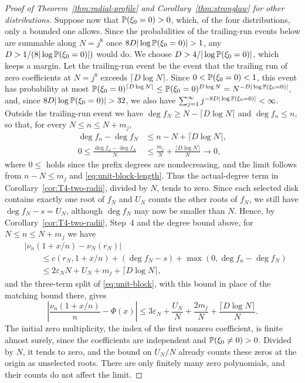 \begin{proof}[Proof of Theorem~\ref{thm:radial-profile} and Corollary~\ref{thm:stronglaw} for other distributions]
Suppose now that $\mathbb P(\xi_0=0)>0$, which, of the four distributions,
only a bounded one allows.
Since the probabilities of the trailing-run events below are summable
along $N=j^8$ once $8D|\log\Prob(\xi_0=0)|>1$, any
$D>1/(8|\log\mathbb P(\xi_0=0)|)$ would do.
We choose $D>4/|\log\mathbb P(\xi_0=0)|$, which keeps a margin.
Let the trailing-run event be the event that the trailing run of zero
coefficients at $N=j^8$ exceeds $\lceil D\log N\rceil$.
Since $0<\mathbb P(\xi_0=0)<1$, this event has probability at most
$\mathbb P(\xi_0=0)^{\lceil D\log N\rceil}\le\mathbb P(\xi_0=0)^{D\log N}
 =N^{-D|\log\mathbb P(\xi_0=0)|}$, and, since $8D|\log\Prob(\xi_0=0)|>32$,
we also have $\sum_{j=1}^\infty j^{-8D|\log\mathbb P(\xi_0=0)|}<\infty$.
Outside the trailing-run event we have
$\deg f_N\ge N-\lceil D\log N\rceil$ and $\deg f_n\le n$,
so that, for every $N\le n\le N+m_j$,
\begin{align*}
 \deg f_n-\deg f_N&\le n-N+\lceil D\log N\rceil,\\
 0\le\frac{\deg f_n-\deg f_N}{N}
 &\le\frac{m_j}{N}+\frac{\lceil D\log N\rceil}{N}
 \longrightarrow0,
\end{align*}
where $0\le$ holds since the prefix degrees are nondecreasing, and the
limit follows from $n-N\le m_j$ and \eqref{eq:unit-block-length}.
Thus the actual-degree term in Corollary~\ref{cor:T4-two-radii}, divided
by $N$, tends to zero.
Since each selected disk contains exactly one root of $f_N$ and $U_N$
counts the other roots of $f_N$, we still have $\deg f_N-s=U_N$, although
$\deg f_N$ may now be smaller than $N$.
Hence, by Corollary~\ref{cor:T4-two-radii}, Step~4 and the degree bound
above, for $N\le n\le N+m_j$ we have
\begin{align*}
 &|\nu_n(1+x/n)-\nu_N(r_N)|\\
 &\qquad\le c(r_N,1+x/n)+(\deg f_N-s)+\max(0,\deg f_n-\deg f_N)\\
 &\qquad\le2\varepsilon_NN+U_N+m_j+\lceil D\log N\rceil,
\end{align*}
and the three-term split of \eqref{eq:unit-block}, with this bound in
place of the matching bound there, gives
\begin{equation}
 \left|\frac{\nu_n(1+x/n)}n-\Phi(x)\right|
 \le3\varepsilon_N+\frac{U_N}N+\frac{2m_j}N+\frac{\lceil D\log N\rceil}N.
 \label{eq:model-block}
\end{equation}
The initial zero multiplicity, the index of the first nonzero
coefficient, is finite almost surely, since the coefficients are
independent and $\mathbb P(\xi_0\ne0)>0$. Divided by $N$, it tends to zero,
and the bound on $U_N/N$ already counts these zeros at the origin as
unselected roots.
There are only finitely many zero polynomials, and their counts do not
affect the limit.


\end{proof}
